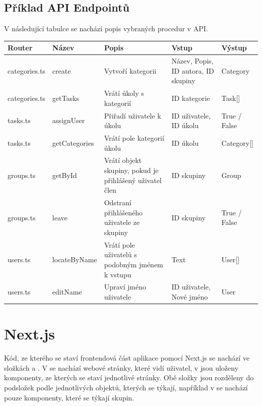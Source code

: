 \subsection{Příklad API Endpointů}

V následující tabulce se nachází popis vybraných procedur v API.

\begin{tabularx}{1\textwidth} { 
	| >{\centering\arraybackslash}X 
	| >{\centering\arraybackslash}X 
	| >{\centering\arraybackslash}X 
	| >{\centering\arraybackslash}X 
	| >{\centering\arraybackslash}X | }
	\hline
	\textbf{Router} & \textbf{Název} & \textbf{Popis}                                                  & \textbf{Vstup}                       & \textbf{Výstup} \\
	\hline
	categories.ts   & create          & Vytvoří kategorii                                             & Název, Popis, ID autora, ID skupiny & Category         \\
	\hline
	categories.ts   & getTasks        & Vrátí úkoly s kategorií                                     & ID kategorie                         & Task[]           \\
	\hline
	tasks.ts        & assignUser      & Přiřadí uživatele k úkolu                                  & ID uživatele, ID úkolu             & True / False     \\
	\hline
	tasks.ts        & getCategories   & Vrátí pole kategorií úkolu                                  & ID úkolu                            & Category[]       \\
	\hline
	groups.ts       & getById         & Vrátí objekt skupiny, pokud je přihlášený uživatel člen & ID skupiny                           & Group            \\
	\hline
	groups.ts       & leave           & Odstraní přihlášeného uživatele ze skupiny                & ID skupiny                           & True / False     \\
	\hline
	users.ts        & locateByName    & Vrátí pole uživatelů s podobným jménem k vstupu           & Text                                 & User[]           \\
	\hline
	users.ts        & editName        & Upraví jméno uživatele                                       & ID uživatele, Nové jméno          & User             \\
	\hline
\end{tabularx}
\newpage
\section{Next.js}
Kód, ze kterého se staví frontendová část aplikace pomocí Next.js se nachází ve složkách  a . V  se nachází webové stránky, které vidí uživatel, v  jsou uloženy komponenty, ze kterých se staví jednotlivé stránky.
Obě složky jsou rozděleny do podsložek podle jednotlivých objektů, kterých se týkají, například v  se nachází pouze komponenty, které se týkají skupin.
